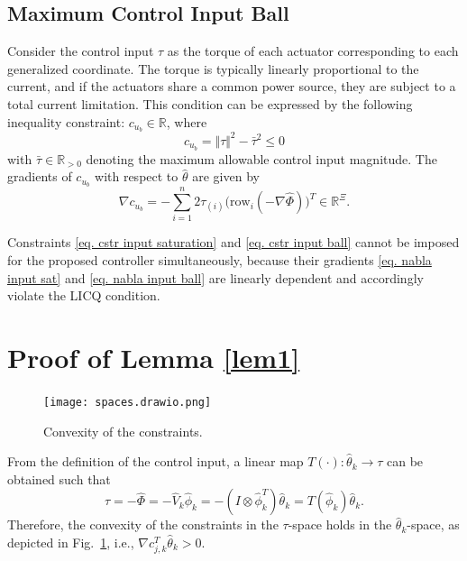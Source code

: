\documentclass[lettersize,journal]{IEEEtran}
\begin{document}
\subsection{Maximum Control Input Ball}

Consider the control input $\tau$ as the torque of each actuator corresponding to each generalized coordinate. The torque is typically linearly proportional to the current, and if the actuators share a common power source, they are subject to a total current limitation. This condition can be expressed by the following inequality constraint: $c_{u_b} \in\mathbb R$, where 
\begin{equation}
    c_{u_b}=\Vert\tau\Vert^2 -\bar\tau^2  \le 0
    \label{eq. cstr input ball}
\end{equation}
with $\bar\tau\in\mathbb{R}_{>0}$ denoting the maximum allowable control input magnitude.
The gradients of $c_{u_b}$ with respect to $\hat\theta$ are given by
\begin{equation}
    \nabla c_{u_b} = -\sum_{i=1}^n 2\tau_{(i)} 
    \bigg(
        \text{row}_i(-\nabla\hat\Phi)
    \bigg)^T  
    \in \mathbb R^{\Xi}.
    \label{eq. nabla input ball}
\end{equation}

Constraints \eqref{eq. cstr input saturation} and \eqref{eq. cstr input ball} cannot be imposed for the proposed controller simultaneously, because their gradients \eqref{eq. nabla input sat} and \eqref{eq. nabla input ball} are linearly dependent and accordingly violate the LICQ condition.

\section{Proof of Lemma \ref{lem1}}\label{sec:proof lem1}

\begin{figure}[!t]
    \centering
    \texttt{[image: spaces.drawio.png]}
    \caption{Convexity of the constraints.}
    \label{fig: spaces}
\end{figure}

From the definition of the control input, a linear map $T(\cdot):\hat\theta_k\to\tau$ can be obtained such that 
\begin{equation}
    \tau = -\hat\Phi = -\hat V_k \hat\phi_k = -(I\otimes \hat\phi_k^T)\hat\theta_k = T(\hat\phi_k) \hat\theta_k.
\end{equation}
Therefore, the convexity of the constraints in the $\tau$-space holds in the $\hat\theta_k$-space, as depicted in Fig.~\ref{fig: spaces}, i.e., $\nabla c_{j,k}^T\hat\theta_k>0$.
\end{document}
